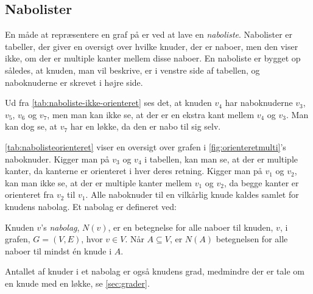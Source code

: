 \subsection{Nabolister}
En måde at repræsentere en graf på er ved at lave en \emph{naboliste}. Nabolister er tabeller, der giver en oversigt over hvilke knuder, der er naboer, men den viser ikke, om der er multiple kanter mellem disse naboer. En naboliste er bygget op således, at knuden, man vil beskrive, er i venstre side af tabellen, og naboknuderne er skrevet i højre side. 




Ud fra \autoref{tab:naboliste-ikke-orienteret} ses det, at knuden $v_4$ har naboknuderne $v_3$, $v_5$, $v_6$ og $v_7$, men man kan ikke se, at der er en ekstra kant mellem $v_4$ og $v_3$. Man kan dog se, at $v_7$ har en løkke, da den er nabo til sig selv.


\autoref{tab:nabolisteorienteret} viser en oversigt over grafen i \autoref{fig:orienteretmulti}'s naboknuder. Kigger man på $v_3$ og $v_4$ i tabellen, kan man se, at der er multiple kanter, da kanterne er orienteret i hver deres retning. Kigger man på $v_1$ og $v_2$, kan man ikke se, at der er multiple kanter mellem $v_1$ og $v_2$, da begge kanter er orienteret fra $v_2$ til $v_1$. Alle naboknuder til en vilkårlig knude kaldes samlet for knudens nabolag. Et nabolag er defineret ved:

\begin{defn}[Nabolag] \label{defn:nabolag}
Knuden $v$'s \emph{nabolag}, $N(v)$, er en betegnelse for alle naboer til knuden, $v$, i grafen, $G=(V,E)$, hvor $v \in V$. Når $A \subseteq V$, er $N(A)$ betegnelsen for alle naboer til mindst én knude i $A$.
\end{defn}

Antallet af knuder i et nabolag er også knudens grad, medmindre der er tale om en knude med en løkke, se \autoref{sec:grader}. 
